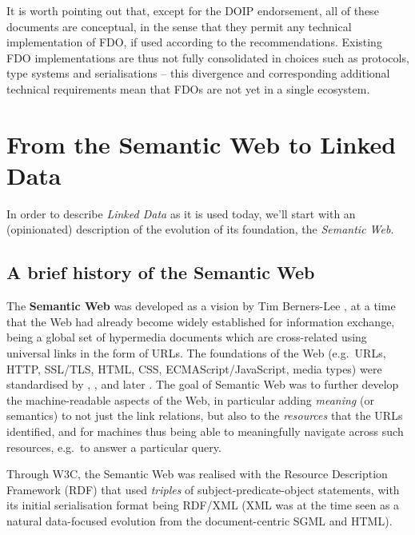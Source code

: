 It is worth pointing out that, except for the DOIP endorsement, all of these documents are conceptual, in the sense that they permit any technical implementation of FDO, if used according to the recommendations. 
Existing FDO implementations \cite{wittenburgFAIRDigitalObject2022b} are thus not fully consolidated in choices such as protocols, type systems and serialisations -- this divergence and corresponding additional technical requirements mean that FDOs are not yet in a single ecosystem.


\section{From the Semantic Web to Linked Data}\label{ch3:ld}

In order to describe \emph{Linked Data} as it is used today, we'll start with an (opinionated) description of the evolution of its foundation, the \emph{Semantic Web}.

\subsection{A brief history of the Semantic Web}\label{ch3:semweb}

The \textbf{Semantic Web} was developed as a vision by Tim Berners-Lee \cite{berners-leeWeavingWebOriginal1999}, at a time that the Web had already become widely established for information exchange, being a global set of hypermedia documents which are cross-related using universal links in the form of URLs. The foundations of the Web (e.g.~URLs, HTTP, SSL/TLS, HTML, CSS, ECMAScript/JavaScript, media types) were standardised by , ,  and later . The goal of Semantic Web was to further develop the machine-readable aspects of the Web, in particular adding \emph{meaning} (or semantics) to not just the link relations, but also to the \emph{resources} that the URLs identified, and for machines thus being able to meaningfully navigate across such resources, e.g.~to answer a particular query.

Through W3C, the Semantic Web was realised with the Resource Description Framework (RDF) \cite{w3-rdf11-primer} that used \emph{triples} of subject-predicate-object statements, with its initial serialisation format \cite{w3-rdf-syntax99} being RDF/XML (XML was at the time seen as a natural data-focused evolution from the document-centric SGML and HTML).

